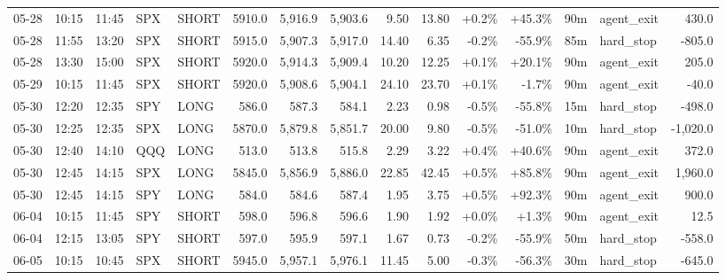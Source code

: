 \documentclass[11pt,a4paper,twoside]{article}
\begin{document}
\begin{landscape}
\begin{center}
\begin{longtable}{>{\color{txtmain}}l l l l l r r r r r r r r >{\color{txtmain}}l r}
05-28 & 10:15 & 11:45 & SPX & SHORT & 5910.0 & 5,916.9 & 5,903.6 & 9.50 & 13.80 & \textcolor{wingreen}{+0.2\%} & \textcolor{wingreen}{+45.3\%} & 90m & agent\_exit & \textcolor{wingreen}{430.0} \\
05-28 & 11:55 & 13:20 & SPX & SHORT & 5915.0 & 5,907.3 & 5,917.0 & 14.40 & 6.35 & \textcolor{lossred}{-0.2\%} & \textcolor{lossred}{-55.9\%} & 85m & hard\_stop & \textcolor{lossred}{-805.0} \\
05-28 & 13:30 & 15:00 & SPX & SHORT & 5920.0 & 5,914.3 & 5,909.4 & 10.20 & 12.25 & \textcolor{wingreen}{+0.1\%} & \textcolor{wingreen}{+20.1\%} & 90m & agent\_exit & \textcolor{wingreen}{205.0} \\
05-29 & 10:15 & 11:45 & SPX & SHORT & 5920.0 & 5,908.6 & 5,904.1 & 24.10 & 23.70 & \textcolor{wingreen}{+0.1\%} & \textcolor{lossred}{-1.7\%} & 90m & agent\_exit & \textcolor{lossred}{-40.0} \\
05-30 & 12:20 & 12:35 & SPY & LONG & 586.0 & 587.3 & 584.1 & 2.23 & 0.98 & \textcolor{lossred}{-0.5\%} & \textcolor{lossred}{-55.8\%} & 15m & hard\_stop & \textcolor{lossred}{-498.0} \\
05-30 & 12:25 & 12:35 & SPX & LONG & 5870.0 & 5,879.8 & 5,851.7 & 20.00 & 9.80 & \textcolor{lossred}{-0.5\%} & \textcolor{lossred}{-51.0\%} & 10m & hard\_stop & \textcolor{lossred}{-1,020.0} \\
05-30 & 12:40 & 14:10 & QQQ & LONG & 513.0 & 513.8 & 515.8 & 2.29 & 3.22 & \textcolor{wingreen}{+0.4\%} & \textcolor{wingreen}{+40.6\%} & 90m & agent\_exit & \textcolor{wingreen}{372.0} \\
05-30 & 12:45 & 14:15 & SPX & LONG & 5845.0 & 5,856.9 & 5,886.0 & 22.85 & 42.45 & \textcolor{wingreen}{+0.5\%} & \textcolor{wingreen}{+85.8\%} & 90m & agent\_exit & \textcolor{wingreen}{1,960.0} \\
05-30 & 12:45 & 14:15 & SPY & LONG & 584.0 & 584.6 & 587.4 & 1.95 & 3.75 & \textcolor{wingreen}{+0.5\%} & \textcolor{wingreen}{+92.3\%} & 90m & agent\_exit & \textcolor{wingreen}{900.0} \\
06-04 & 10:15 & 11:45 & SPY & SHORT & 598.0 & 596.8 & 596.6 & 1.90 & 1.92 & \textcolor{wingreen}{+0.0\%} & \textcolor{wingreen}{+1.3\%} & 90m & agent\_exit & \textcolor{wingreen}{12.5} \\
06-04 & 12:15 & 13:05 & SPY & SHORT & 597.0 & 595.9 & 597.1 & 1.67 & 0.73 & \textcolor{lossred}{-0.2\%} & \textcolor{lossred}{-55.9\%} & 50m & hard\_stop & \textcolor{lossred}{-558.0} \\
06-05 & 10:15 & 10:45 & SPX & SHORT & 5945.0 & 5,957.1 & 5,976.1 & 11.45 & 5.00 & \textcolor{lossred}{-0.3\%} & \textcolor{lossred}{-56.3\%} & 30m & hard\_stop & \textcolor{lossred}{-645.0} \\

\end{longtable}
\end{center}
\end{landscape}
\end{document}
